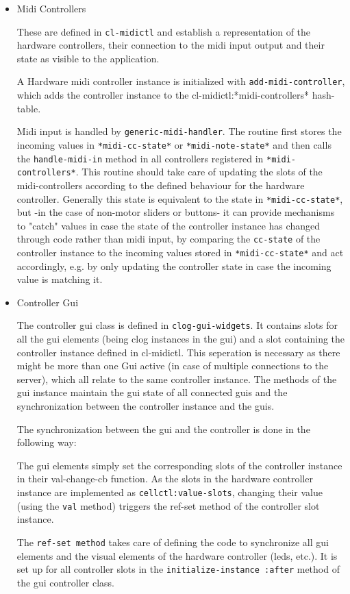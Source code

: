 \documentclass[a4paper]{article}
\begin{document}
\begin{itemize}
\item Midi Controllers

These are defined in \texttt{cl-midictl} and establish a representation
of the hardware controllers, their connection to the midi input
output and their state as visible to the application.

A Hardware midi controller instance is initialized with
\texttt{add-midi-controller}, which adds the controller instance to the
cl-midictl:*midi-controllers* hash-table.

Midi input is handled by \texttt{generic-midi-handler}. The routine
first stores the incoming values in \texttt{*midi-cc-state*} or
\texttt{*midi-note-state*} and then calls the \texttt{handle-midi-in} method in
all controllers registered in \texttt{*midi-controllers*}. This routine
should take care of updating the slots of the midi-controllers
according to the defined behaviour for the hardware
controller. Generally this state is equivalent to the state in
\texttt{*midi-cc-state*}, but -in the case of non-motor sliders or
buttons- it can provide mechanisms to "catch" values in case the
state of the controller instance has changed through code rather
than midi input, by comparing the \texttt{cc-state} of the controller
instance to the incoming values stored in \texttt{*midi-cc-state*} and
act accordingly, e.g. by only updating the controller state in
case the incoming value is matching it.

\item Controller Gui

The controller gui class is defined in \texttt{clog-gui-widgets}. It
contains slots for all the gui elements (being clog instances in
the gui) and a slot containing the controller instance defined in
cl-midictl. This seperation is necessary as there might be more
than one Gui active (in case of multiple connections to the
server), which all relate to the same controller instance. The
methods of the gui instance maintain the gui state of all
connected guis and the synchronization between the controller
instance and the guis.

The synchronization between the gui and the controller is done in
the following way:

The gui elements simply set the corresponding slots of the
controller instance in their val-change-cb function. As the slots
in the hardware controller instance are implemented as
\texttt{cellctl:value-slots}, changing their value (using the \texttt{val}
method) triggers the ref-set method of the controller slot
instance.

The \texttt{ref-set method} takes care of defining the code to
synchronize all gui elements and the visual elements of the
hardware controller (leds, etc.). It is set up for all controller
slots in the \texttt{initialize-instance :after} method of the gui
controller class.
\end{itemize}
\end{document}
